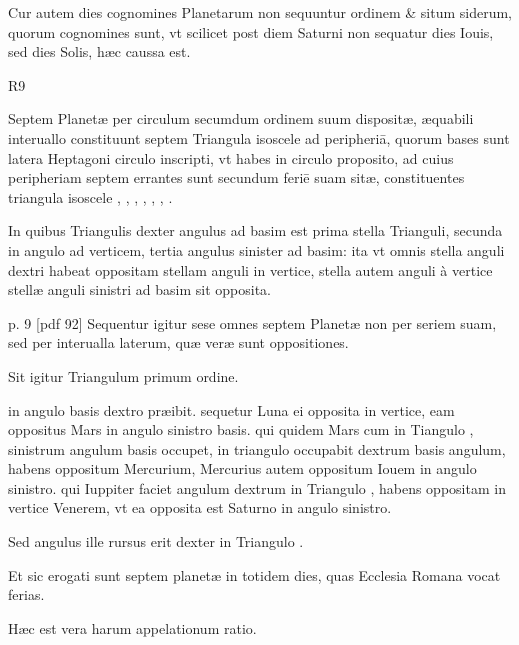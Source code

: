 \begin{parnumbers}
Cur autem dies cognomines Planetarum non sequuntur ordinem \& situm siderum, quorum cognomines sunt, vt scilicet post diem Saturni non sequatur dies Iouis, sed dies Solis, hæc caussa est.

\begin{wrapfigure}[9]{R}{9\baselineskip}
  \centering
  \def\svgwidth{9\baselineskip}
  {\astrofont}
\end{wrapfigure}

Septem Planetæ per circulum secumdum ordinem suum dispositæ, æquabili interuallo constituunt septem Triangula isoscele ad peripheriā,  quorum bases sunt latera Heptagoni circulo inscripti, vt habes in circulo proposito, ad cuius peripheriam septem errantes sunt secundum feriē suam sitæ, constituentes triangula isoscele , , , , , , .

In quibus Triangulis dexter angulus ad basim est prima stella Trianguli, secunda in angulo ad verticem, tertia angulus sinister ad basim: ita vt omnis stella anguli dextri habeat oppositam  stellam anguli in vertice, stella autem anguli à vertice stellæ anguli sinistri ad basim sit opposita.

\clearpage
p. 9 [pdf 92]
Sequentur igitur sese omnes septem Planetæ non per seriem suam, sed per interualla laterum, quæ veræ sunt oppositiones.

Sit igitur Triangulum  primum ordine.

 in angulo basis dextro præibit. sequetur Luna ei opposita in vertice, eam oppositus Mars in angulo sinistro basis. qui quidem Mars cum in Tiangulo , sinistrum angulum basis occupet, in triangulo  occupabit dextrum basis angulum, habens oppositum Mercurium, Mercurius autem oppositum Iouem in angulo sinistro. qui Iuppiter faciet angulum dextrum in Triangulo , habens oppositam in vertice  Venerem, vt ea opposita est Saturno in angulo sinistro.

Sed angulus ille rursus erit dexter in Triangulo .

Et sic erogati sunt septem planetæ in totidem dies, quas Ecclesia Romana vocat ferias.

Hæc est vera harum appelationum ratio.

\end{parnumbers}


